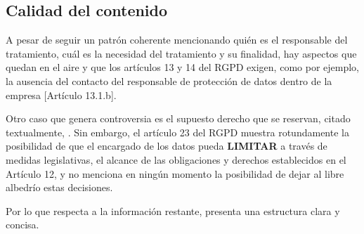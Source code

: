 \subsection{Calidad del contenido}
A pesar de seguir un patrón coherente mencionando quién es el responsable del tratamiento, cuál es la necesidad del tratamiento y su finalidad, hay aspectos que quedan en el aire y que los artículos 13 y 14 del RGPD exigen, como por ejemplo, la ausencia del contacto del responsable de protección de datos dentro de la empresa [Artículo 13.1.b].

Otro caso que genera controversia es el supuesto derecho que se reservan, citado textualmente, . Sin embargo, el artículo 23 del RGPD muestra rotundamente la posibilidad de que el encargado de los datos pueda \textbf{LIMITAR} a través de medidas legislativas, el alcance de las obligaciones y derechos establecidos en el Artículo 12, y no menciona en ningún momento la posibilidad de dejar al libre albedrío estas decisiones.

Por lo que respecta a la información restante, presenta una estructura clara y concisa.
